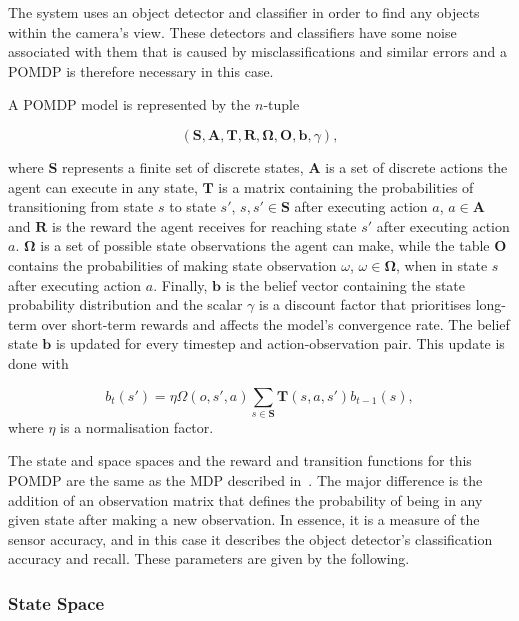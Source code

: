 \documentclass[runningheads]{llncs}
\begin{document}
The system uses an object detector and classifier in order to find any objects within the camera's view.
These detectors and classifiers have some noise associated with them that is caused by misclassifications and similar errors and a POMDP is therefore necessary in this case.

A POMDP model is represented by the $n$-tuple

\begin{equation}
  (\mathbf{S}, \mathbf{A}, \mathbf{T}, \mathbf{R}, \mathbf{\Omega}, \mathbf{O}, \mathbf{b}, \gamma),
\end{equation}

\noindent where $\mathbf{S}$ represents a finite set of discrete states, $\mathbf{A}$ is a set of discrete actions the agent can execute in any state, $\mathbf{T}$ is a matrix containing the probabilities of transitioning from state $s$ to state $s'$, $s, s' \in \mathbf{S}$ after executing action $a$, $a \in \mathbf{A}$ and $\mathbf{R}$ is the reward the agent receives for reaching state $s'$ after executing action $a$.
$\mathbf{\Omega}$ is a set of possible state observations the agent can make, while the table $\mathbf{O}$ contains the probabilities of making state observation $\omega$, $\omega \in \mathbf{\Omega}$, when in state $s$ after executing action $a$.
Finally, $\mathbf{b}$ is the belief vector containing the state probability distribution and the scalar $\gamma$ is a discount factor that prioritises long-term over short-term rewards and affects the model's convergence rate. 
The belief state $\mathbf{b}$ is updated for every timestep and action-observation pair.
This update is done with

\begin{equation}
  b_t(s') = \eta\Omega(o, s', a)\sum_{s\in\mathbf{S}}\mathbf{T}(s, a, s')b_{t-1}(s), 
\end{equation}
where $\eta$ is a normalisation factor. 

The state and space spaces and the reward and transition functions for this POMDP are the same as the MDP described in~\cite{lock2019active}. 
The major difference is the addition of an observation matrix that defines the probability of being in any given state after making a new observation.
In essence, it is a measure of the sensor accuracy, and in this case it describes the object detector's classification accuracy and recall.
These parameters are given by the following. 

\subsubsection{State Space}
\end{document}
